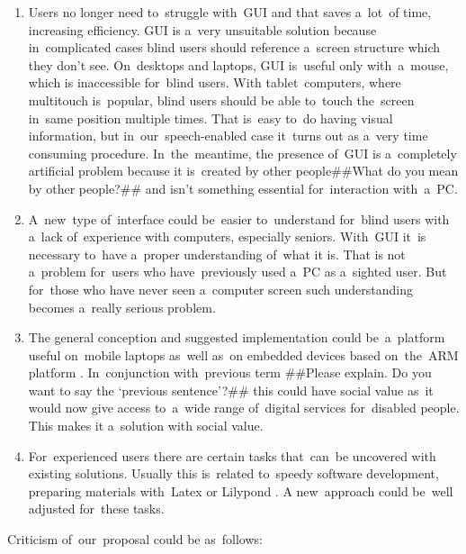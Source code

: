 \documentclass{acm_proc_article-sp}
\begin{document}
\begin{enumerate}

\item {
Users no longer need to~struggle with~GUI and that saves a~lot~of time, increasing efficiency. 
GUI is a~very unsuitable solution 
because in~complicated cases blind users should reference a~screen structure which they don't see.
On~desktops and laptops, GUI is~useful only with~a~mouse,
which is inaccessible for~blind users.
With tablet~computers, where multitouch is~popular, blind users should 
be able to~touch the~screen in~same position multiple times.
That is~easy to~do  having visual information, 
but in~our~speech-enabled case it~turns out as a~very time consuming procedure. 
In~the~meantime, the presence of~GUI is a~completely artificial problem
because it is~created by other people##What do you mean by other people?## and isn't something essential for~interaction with~a~PC.
}

\item {
A~new~type of~interface could be~easier  to~understand 
for~blind users with a~lack of~experience with computers, especially seniors.
With~GUI it~is necessary to~have a~proper understanding of~what it is.
That is not a~problem for~users who have~previously used a~PC as a~sighted user.
But for~those who have never seen a~computer screen such understanding 
becomes a~really serious problem.
}

\item {
The general conception and suggested implementation could be~a~platform 
useful on~mobile laptops as~well as~on embedded devices based on~the~ARM platform \cite{arm}.
In~conjunction with~previous term ##Please explain. Do you want to say the ‘previous sentence’?## this could have social value as~it
would now give access to~a~wide range of~digital services for~disabled people.
This makes it a~solution with social value.
}

\item {
For~experienced users there are certain tasks that~can~be uncovered with existing solutions.
Usually this is~related to~speedy software development,
preparing materials with~Latex \cite{latex} or Lilypond \cite{lilypond}.
A new~approach could be~well adjusted for~these tasks.
}

\end{enumerate}

Criticism of~our~proposal  could be as~follows:
\end{document}
